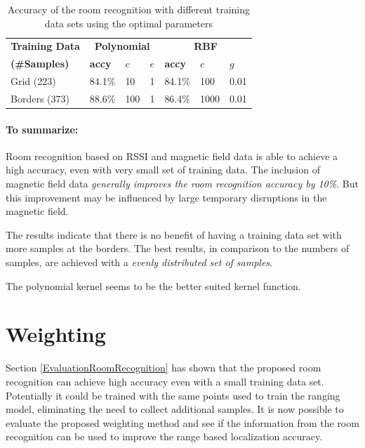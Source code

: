 \begin{table}
\centering
\begin{tabular}{l l l l l l l}
\toprule
\textbf{Training Data}&\multicolumn{3}{c}{\textbf{Polynomial}}&\multicolumn{3}{c}{\textbf{RBF}}\\
\textbf{(\#Samples)}&\textbf{accy}&$c$&$e$&\textbf{accy}&$c$&$g$\\
\midrule
Grid (223)&84.1\%&10&1&84.1\%&100&0.01\\
Borders (373)&88.6\%&100&1&86.4\%&1000&0.01\\
\bottomrule
\end{tabular}
\caption[Room Recognition - polynomial kernel parameter selection]{Accuracy of the room recognition with different training data sets using the optimal parameters}
\label{tab:SVMconfigurationPoly}
\end{table}



\paragraph{To summarize:} Room recognition based on RSSI and magnetic field data is able to achieve a high accuracy, even with very small set of training data. The inclusion of magnetic field data \emph{generally improves the room recognition accuracy by 10\%}. But this improvement may be influenced by large temporary disruptions in the magnetic field.

The results indicate that there is no benefit of having a training data set with more samples at the borders. The best results, in comparison to the numbers of samples, are achieved with a \emph{evenly distributed set of samples}. 
 
The polynomial kernel seems to be the better suited kernel function.






\section{Weighting}
\label{EvaluationWeighting}

Section \ref{EvaluationRoomRecognition} has shown that the proposed room recognition can achieve high accuracy even with a small training data set. Potentially it could be trained with the same points used to train the ranging model, eliminating the need to collect additional samples. It is now possible to evaluate the proposed weighting method and see if the information from the room recognition can be used to improve the range based localization accuracy.

